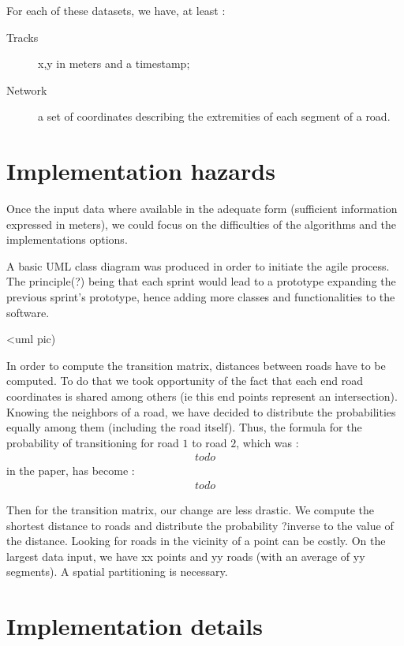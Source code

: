 For each of these datasets, we have, at least :
\begin{description}
	\item[Tracks] x,y in meters and a timestamp;
	\item[Network] a set of coordinates describing the extremities of each segment of a road.
\end{description}

\section{Implementation hazards}

Once the input data where available in the adequate form (sufficient information expressed in meters), we could focus on the difficulties of the algorithms and the implementations options. 

A basic UML class diagram was produced in order to initiate the agile process. The principle(?) being that each sprint would lead to a prototype expanding the previous sprint's prototype, hence adding more classes and functionalities to the software.

<uml pic)

In order to compute the transition matrix, distances between roads have to be computed. To do that we took opportunity of the fact that each end road coordinates is shared among others (ie this end points represent an intersection). Knowing the neighbors of a road, we have decided to distribute the probabilities equally among them (including the road itself).
Thus, the formula for the probability of transitioning for road $1$ to road $2$, which was :
\begin{eqnarray}
todo
\end{eqnarray}
in the paper, has become :
\begin{eqnarray}
todo
\end{eqnarray}

Then for the transition matrix, our change are less drastic. We compute the shortest distance to roads and distribute the probability ?inverse to the value of the distance. 
Looking for roads in the vicinity of a point can be costly. On the largest data input, we have xx points and yy roads (with an average of yy segments). A spatial partitioning is necessary.

\section{Implementation details}

